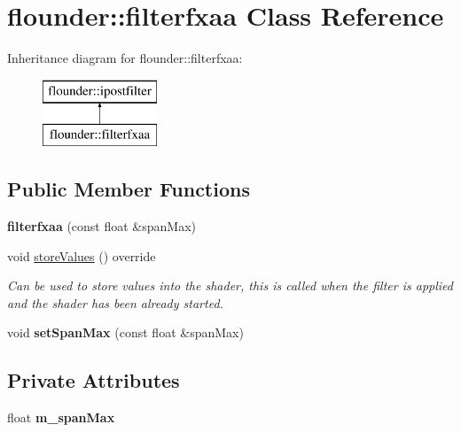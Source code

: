 \hypertarget{classflounder_1_1filterfxaa}{}\section{flounder\+:\+:filterfxaa Class Reference}
\label{classflounder_1_1filterfxaa}
Inheritance diagram for flounder\+:\+:filterfxaa\+:\begin{figure}[H]
\begin{center}
\leavevmode
\includegraphics[height=2.000000cm]{classflounder_1_1filterfxaa}
\end{center}
\end{figure}
\subsection*{Public Member Functions}
\begin{DoxyCompactItemize}
\item 
\mbox{\label{classflounder_1_1filterfxaa_aedc837c39551ff54c89704d3f14975e1}} 
{\bfseries filterfxaa} (const float \&span\+Max)
\item 
void \hyperlink{classflounder_1_1filterfxaa_abee255cfd538d96881386157e6e8eea0}{store\+Values} () override
\begin{DoxyCompactList}\small\item\em Can be used to store values into the shader, this is called when the filter is applied and the shader has been already started. \end{DoxyCompactList}\item 
\mbox{\label{classflounder_1_1filterfxaa_a0d3b09024e4966bdafecbc5b388cc129}} 
void {\bfseries set\+Span\+Max} (const float \&span\+Max)
\end{DoxyCompactItemize}
\subsection*{Private Attributes}
\begin{DoxyCompactItemize}
\item 
\mbox{\label{classflounder_1_1filterfxaa_a6f59a5c3990455c2ddb30e2df9e1a140}} 
float {\bfseries m\+\_\+span\+Max}
\end{DoxyCompactItemize}
